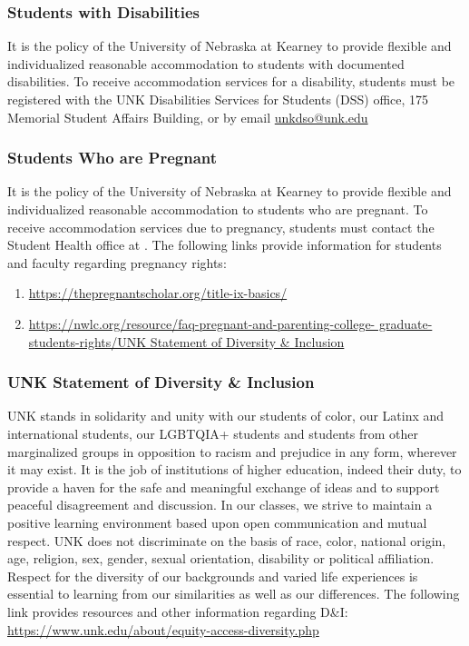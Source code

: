 \documentclass[12pt]{article}
\newcounter{ex}\setcounter{ex}{0}
\begin{document}
\subsubsection*{Students with Disabilities}

It is the policy of the University of Nebraska at Kearney to provide flexible and individualized reasonable accommodation to students with documented disabilities. To receive accommodation services for a disability, students must be registered with the UNK Disabilities Services for Students (DSS) office, 175 Memorial Student 
Affairs Building,   or by 
email \href{mailto:unkdso@unk.edu}{unkdso@unk.edu}

\subsubsection*{Students Who are Pregnant}

It is the policy of the University of Nebraska at Kearney to provide flexible 
and individualized reasonable accommodation to students who are pregnant. 
To receive accommodation services due to pregnancy, students must contact 
the Student Health office at . The following 
links provide information for students and faculty regarding pregnancy 
rights:
\small
\begin{enumerate}
  \item \url{https://thepregnantscholar.org/title-ix-basics/}
  \item \url{https://nwlc.org/resource/faq-pregnant-and-parenting-college-
  graduate-students-rights/UNK Statement of Diversity & Inclusion}
\end{enumerate}
\normalsize

\subsubsection*{UNK Statement of Diversity \& Inclusion}

UNK stands in solidarity and unity with our students of color, our Latinx and international students, our LGBTQIA+ students 
and students from other marginalized groups in opposition to racism 
and prejudice in any form, wherever it may exist. It is the job of 
institutions of higher education, indeed their duty, to provide a 
haven for the safe and meaningful exchange of ideas and to support 
peaceful disagreement and discussion. In our classes, we strive to 
maintain a positive learning environment based upon open 
communication and mutual respect. UNK does not discriminate on the 
basis of race, color, national origin, age, religion, sex, gender, 
sexual orientation, disability or political affiliation. 
Respect for the diversity of our backgrounds and varied life 
experiences is essential to learning from our similarities as well 
as our differences. The following link provides resources and other 
information regarding D\&I: \url{https://www.unk.edu/about/equity-access-diversity.php}

%
%
\end{document}
